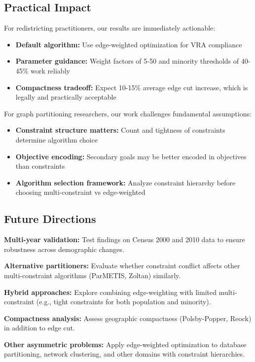 \subsection{Practical Impact}

For redistricting practitioners, our results are immediately actionable:
\begin{itemize}
    \item \textbf{Default algorithm:} Use edge-weighted optimization for VRA compliance
    \item \textbf{Parameter guidance:} Weight factors of 5-50 and minority thresholds of 40-45\% work reliably
    \item \textbf{Compactness tradeoff:} Expect 10-15\% average edge cut increase, which is legally and practically acceptable
\end{itemize}

For graph partitioning researchers, our work challenges fundamental assumptions:
\begin{itemize}
    \item \textbf{Constraint structure matters:} Count and tightness of constraints determine algorithm choice
    \item \textbf{Objective encoding:} Secondary goals may be better encoded in objectives than constraints
    \item \textbf{Algorithm selection framework:} Analyze constraint hierarchy before choosing multi-constraint vs edge-weighted
\end{itemize}

\subsection{Future Directions}

\textbf{Multi-year validation:} Test findings on Census 2000 and 2010 data to ensure robustness across demographic changes.

\textbf{Alternative partitioners:} Evaluate whether constraint conflict affects other multi-constraint algorithms (ParMETIS, Zoltan) similarly.

\textbf{Hybrid approaches:} Explore combining edge-weighting with limited multi-constraint (e.g., tight constraints for both population and minority).

\textbf{Compactness analysis:} Assess geographic compactness (Polsby-Popper, Reock) in addition to edge cut.

\textbf{Other asymmetric problems:} Apply edge-weighted optimization to database partitioning, network clustering, and other domains with constraint hierarchies.


